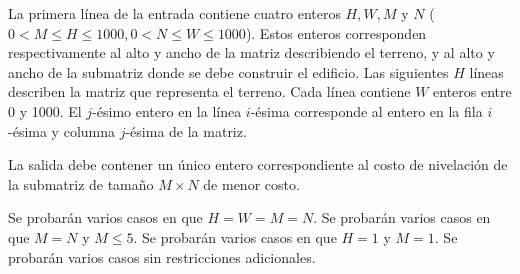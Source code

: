 \documentclass{oci}
\begin{document}
\begin{inputDescription}
  La primera línea de la entrada contiene cuatro enteros $H, W, M$ y $N$
  ($0 < M \leq H\leq 1000, 0 < N \leq W \leq 1000$).
  Estos enteros corresponden respectivamente al alto y ancho de la matriz describiendo el terreno,
  y al alto y ancho de la submatriz donde se debe construir el edificio.
  Las siguientes $H$ líneas describen la matriz que representa el terreno.
  Cada línea contiene $W$ enteros entre 0 y 1000.
  El $j$-ésimo entero en la línea $i$-ésima corresponde al entero en la fila $i$-ésima y
  columna $j$-ésima de la matriz.
\end{inputDescription}

\begin{outputDescription}
  La salida debe contener un único entero correspondiente al costo de nivelación de la submatriz
  de tamaño $M\times N$ de menor costo.
\end{outputDescription}


\begin{scoreDescription}
  Se probarán varios casos en que $H=W=M=N$.
  Se probarán varios casos en que $M=N$ y $M\leq 5$.
  Se probarán varios casos en que $H=1$ y $M=1$.
  Se probarán varios casos sin restricciones adicionales.
\end{scoreDescription}

\begin{sampleDescription}
\end{sampleDescription}
\end{document}
